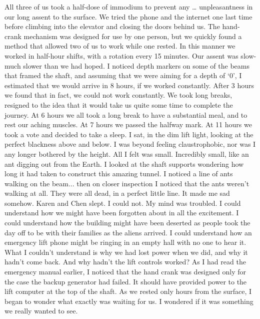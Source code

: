 \documentclass[a4paper]{article}
\begin{document}
All three of us took a half-dose of immodium to prevent any … unpleasantness in our long assent to the surface. We tried the phone and the internet one last time before climbing into the elevator and closing the doors behind us.
The hand-crank mechanism was designed for use by one person, but we quickly found a method that allowed two of us to work while one rested. In this manner we worked in half-hour shifts, with a rotation every 15 minutes. Our assent was slow- much slower than we had hoped.
I noticed depth markers on some of the beams that framed the shaft, and assuming that we were aiming for a depth of ‘0’, I estimated that we would arrive in 8 hours, if we worked constantly. After 3 hours we found that in fact, we could not work constantly. We took long breaks, resigned to the idea that it would take us quite some time to complete the journey.
At 6 hours we all took a long break to have a substantial meal, and to rest our aching muscles. At 7 hours we passed the halfway mark. At 11 hours we took a vote and decided to take a sleep.
I sat, in the dim lift light, looking at the perfect blackness above and below. I was beyond feeling claustrophobic, nor was I any longer bothered by the height. All I felt was small. Incredibly small, like an ant digging out from the Earth.
I looked at the shaft supports wondering how long it had taken to construct this amazing tunnel. I noticed a line of ants walking on the beam... then on closer inspection I noticed that the ants weren't walking at all. They were all dead, in a perfect little line. It made me sad somehow.
Karen and Chen slept. I could not. My mind was troubled.
I could understand how we might have been forgotten about in all the excitement. I could understand how the building might have been deserted as people took the day off to be with their families as the aliens arrived. I could understand how an emergency lift phone might be ringing in an empty hall with no one to hear it.
What I couldn't understand is why we had lost power when we did, and why it hadn't come back. And why hadn’t the lift controls worked? As I had read the emergency manual earlier, I noticed that the hand crank was designed only for the case the backup generator had failed. It should have provided power to the lift computer at the top of the shaft.
As we rested only hours from the surface, I began to wonder what exactly was waiting for us. I wondered if it was something we really wanted to see.
\end{document}
